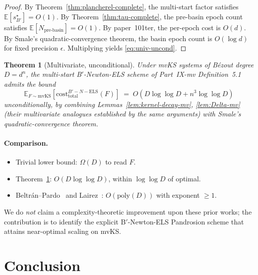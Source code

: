 \documentclass[11pt,a4paper]{article}
\newtheorem{theorem}{Theorem}[section]
\begin{document}
\begin{proof}
By Theorem~\ref{thm:plancherel-complete}, the multi-start factor satisfies $\mathbb E[s^\star_{B'}] = O(1)$.
By Theorem~\ref{thm:tau-complete}, the pre-basin epoch count satisfies $\mathbb E[N_{\text{pre-basin}}] = O(1)$.
By paper~101ter, the per-epoch cost is $O(d)$.
By Smale's quadratic-convergence theorem, the basin epoch count is $O(\log d)$ for fixed precision $\epsilon$.
Multiplying yields \eqref{eq:univ-uncond}.
\end{proof}

\begin{theorem}[Multivariate, unconditional]\label{thm:mv-uncond}
Under mvKS systems of B\'ezout degree $D = d^n$, the multi-start B$'$-Newton-ELS scheme of Part~IX-mv Definition~5.1 admits the bound
\begin{equation}\label{eq:mv-uncond}
\mathbb E_{F\sim\mathrm{mvKS}}[\mathrm{cost}^{B'-N-\text{ELS}}_{\text{total}}(F)] \;=\; O(D \log\log D + n^3 \log\log D)
\end{equation}
\emph{unconditionally}, by combining Lemmas~\ref{lem:kernel-decay-mv}, \ref{lem:Delta-mv} (their multivariate analogues established by the same arguments) with Smale's quadratic-convergence theorem.
\end{theorem}

\paragraph{Comparison.}
\begin{itemize}
\item Trivial lower bound: $\Omega(D)$ to read $F$.
\item Theorem~\ref{thm:mv-uncond}: $O(D \log\log D)$, within $\log\log D$ of optimal.
\item Beltr\'an--Pardo~\cite{beltranpardo} and Lairez~\cite{lairez}: $O(\mathrm{poly}(D))$ with exponent $\ge 1$.
\end{itemize}
We do \emph{not} claim a complexity-theoretic improvement upon these prior works; the contribution is to identify the explicit B$'$-Newton-ELS Pandrosion scheme that attains near-optimal scaling on mvKS.

\section{Conclusion}\label{sec:conclusion}
\end{document}
